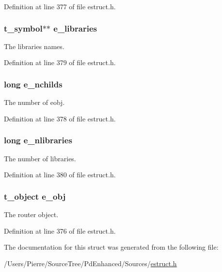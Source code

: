 Definition at line 377 of file estruct.\-h.

\hypertarget{struct__erouter_ad4cb6c25f09dfe6806fde606969accd5}{
\subsubsection[{e\-\_\-libraries}]{\setlength{\rightskip}{0pt plus 5cm}t\-\_\-symbol$\ast$$\ast$ e\-\_\-libraries}}\label{struct__erouter_ad4cb6c25f09dfe6806fde606969accd5}
The libraries names. 

Definition at line 379 of file estruct.\-h.

\hypertarget{struct__erouter_aae6cef9e2d4de46e690ad868953d0923}{
\subsubsection[{e\-\_\-nchilds}]{\setlength{\rightskip}{0pt plus 5cm}long e\-\_\-nchilds}}\label{struct__erouter_aae6cef9e2d4de46e690ad868953d0923}
The number of eobj. 

Definition at line 378 of file estruct.\-h.

\hypertarget{struct__erouter_a8b3fb033a6ba10fb08f5353a71dec2c7}{
\subsubsection[{e\-\_\-nlibraries}]{\setlength{\rightskip}{0pt plus 5cm}long e\-\_\-nlibraries}}\label{struct__erouter_a8b3fb033a6ba10fb08f5353a71dec2c7}
The number of libraries. 

Definition at line 380 of file estruct.\-h.

\hypertarget{struct__erouter_a337dd8dd1771ebe57e90886d4fdfe92d}{
\subsubsection[{e\-\_\-obj}]{\setlength{\rightskip}{0pt plus 5cm}t\-\_\-object e\-\_\-obj}}\label{struct__erouter_a337dd8dd1771ebe57e90886d4fdfe92d}
The router object. 

Definition at line 376 of file estruct.\-h.



The documentation for this struct was generated from the following file\-:\begin{DoxyCompactItemize}
\item 
/\-Users/\-Pierre/\-Source\-Tree/\-Pd\-Enhanced/\-Sources/\hyperlink{estruct_8h}{estruct.\-h}\end{DoxyCompactItemize}

